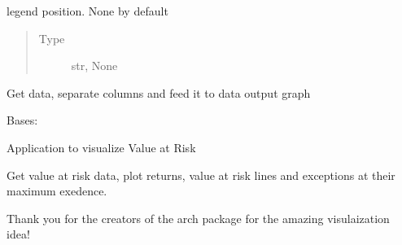 \documentclass[letterpaper,10pt,english]{sphinxmanual}
\begin{document}
\begin{fulllineitems}
\begin{fulllineitems}
\label{\detokenize{dalio.application:dalio.application.graphers.PandasXYGrapher._legend}}
legend position. None by default
\begin{quote}\begin{description}
\item[{Type}] \leavevmode
str, None

\end{description}\end{quote}

\end{fulllineitems}


\begin{fulllineitems}
\label{\detokenize{dalio.application:dalio.application.graphers.PandasXYGrapher.run}}
Get data, separate columns and feed it to data output graph

\end{fulllineitems}


\end{fulllineitems}


\begin{fulllineitems}
\label{\detokenize{dalio.application:dalio.application.graphers.VaRGrapher}}
Bases: {\hyperref[\detokenize{dalio.application:dalio.application.graphers.Grapher}]{}}

Application to visualize Value at Risk

\begin{fulllineitems}
\label{\detokenize{dalio.application:dalio.application.graphers.VaRGrapher.run}}
Get value at risk data, plot returns, value at risk lines and
exceptions at their maximum exedence.

Thank you for the creators of the arch package for the amazing
visulaization idea!

\end{fulllineitems}


\end{fulllineitems}
\end{document}
